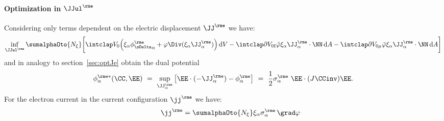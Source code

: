 \paragraph{Optimization in $\JJul^\rme$} %
  Considering only terms dependent on the electric displacement $\JJe$ we have:
  \begin{align}
    \inf_{\JJul^\rme} \sumalphaOto{\Nxi}\bigg[ \intVO \Big(\xia\phieDeltaa + \varphi \Div(\xia\JJe_\alpha) \Big) \dV 
    - \intdVOx{I} \hat\varphi \xia\JJe_{\alpha}\cdot\NN \dA 
    - \intdVOx{\mu} \bar\varphi \xia\JJe_\alpha\cdot\NN \dA \bigg]
    \label{eq:optJe2}
  \end{align}
  and in analogy to section~\ref{sec:optJe} obtain the dual potential
  \begin{align}
    \phies_\alpha(\CC,\EE) \ = \ \sup_{\JJe_\alpha} \big[ \EE\cdot(-\JJe_\alpha) - \phiea \big] \ = \ \frac{1}{2} \sigmae_\alpha \ \EE \cdot (J\CCinv)\EE.
  \end{align}
  For the electron current in the current configuration $\jje$ we have:
  \begin{align}
    \qquad \jje = \sumalphaOto{\Nxi}\xia\sigmae_\alpha\,\grad\varphi
  \end{align}

